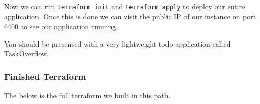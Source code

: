 \documentclass{csse4400}
\begin{document}
Now we can run \texttt{terraform init} and \texttt{terraform apply} to deploy our entire application. Once this is done we can visit the public IP of our instance on port 6400 to see our application running.


You should be presented with a very lightweight todo application called TaskOverflow.

\subsubsection{Finished Terraform}

The below is the full terraform we built in this path.
\end{document}
